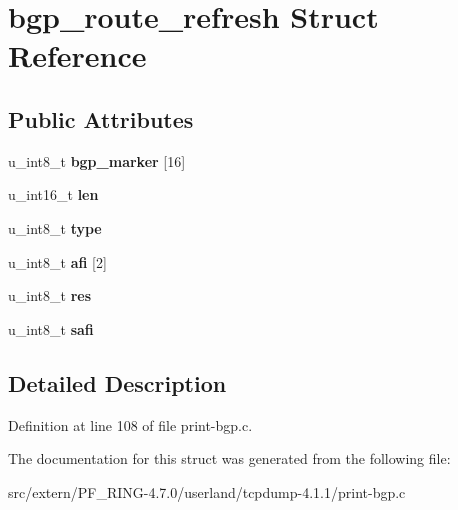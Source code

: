 \hypertarget{structbgp__route__refresh}{
\section{bgp\_\-route\_\-refresh Struct Reference}
\label{structbgp__route__refresh}
}
\subsection*{Public Attributes}
\begin{DoxyCompactItemize}
\item 
\hypertarget{structbgp__route__refresh_af1116bf92a4a714cee0c4bc55cdb4f50}{
u\_\-int8\_\-t {\bfseries bgp\_\-marker} \mbox{[}16\mbox{]}}
\label{structbgp__route__refresh_af1116bf92a4a714cee0c4bc55cdb4f50}

\item 
\hypertarget{structbgp__route__refresh_aac0f24f3514ea5ad0106a2a031749558}{
u\_\-int16\_\-t {\bfseries len}}
\label{structbgp__route__refresh_aac0f24f3514ea5ad0106a2a031749558}

\item 
\hypertarget{structbgp__route__refresh_a20ebd4f5cc376745f29ebb8fd674fc9d}{
u\_\-int8\_\-t {\bfseries type}}
\label{structbgp__route__refresh_a20ebd4f5cc376745f29ebb8fd674fc9d}

\item 
\hypertarget{structbgp__route__refresh_a3ce3db9b69992622bbf967769ccf436c}{
u\_\-int8\_\-t {\bfseries afi} \mbox{[}2\mbox{]}}
\label{structbgp__route__refresh_a3ce3db9b69992622bbf967769ccf436c}

\item 
\hypertarget{structbgp__route__refresh_aaa0d86b87fa48106eae1f58217bcb55c}{
u\_\-int8\_\-t {\bfseries res}}
\label{structbgp__route__refresh_aaa0d86b87fa48106eae1f58217bcb55c}

\item 
\hypertarget{structbgp__route__refresh_a3d5345e2b3ddc8ec8a1b8b79b0d3e447}{
u\_\-int8\_\-t {\bfseries safi}}
\label{structbgp__route__refresh_a3d5345e2b3ddc8ec8a1b8b79b0d3e447}

\end{DoxyCompactItemize}


\subsection{Detailed Description}


Definition at line 108 of file print-\/bgp.c.



The documentation for this struct was generated from the following file:\begin{DoxyCompactItemize}
\item 
src/extern/PF\_\-RING-\/4.7.0/userland/tcpdump-\/4.1.1/print-\/bgp.c\end{DoxyCompactItemize}
